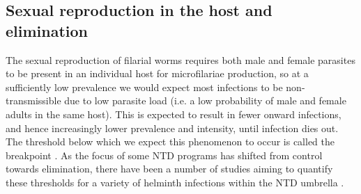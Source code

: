 \subsection[Elimination theory]{Sexual reproduction in the host and elimination}

The sexual reproduction of filarial worms requires both male and female parasites to be present in an individual host for microfilariae production, so at a sufficiently low prevalence we would expect most infections to be non-transmissible due to low parasite load (i.e. a low probability of male and female adults in the same host). This is expected to result in fewer onward infections, and hence increasingly lower prevalence and intensity, until infection dies out. The threshold below which we expect this phenomenon to occur is called the breakpoint \cite{Anderson1992,Anderson2017}. As the focus of some NTD programs has shifted from control towards elimination, there have been a number of studies aiming to quantify these thresholds for a variety of helminth infections within the NTD umbrella \cite{Truscott2017,Irvine2018,Klepac2015,Hollingsworth2015}.

